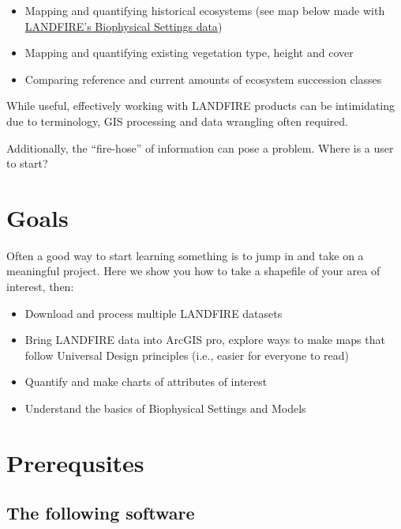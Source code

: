 \documentclass[
  letterpaper,
  DIV=11,
  numbers=noendperiod]{scrreprt}
\providecommand{\tightlist}{%
  \setlength{\itemsep}{0pt}\setlength{\parskip}{0pt}}\usepackage{longtable,booktabs,array}
\begin{document}
\begin{itemize}
\tightlist
\item
  Mapping and quantifying historical ecosystems (see map below made with
  \href{https://landfire.gov/bps.php}{LANDFIRE's Biophysical Settings
  data})
\item
  Mapping and quantifying existing vegetation type, height and cover
\item
  Comparing reference and current amounts of ecosystem succession
  classes
\end{itemize}

While useful, effectively working with LANDFIRE products can be
intimidating due to terminology, GIS processing and data wrangling often
required.

Additionally, the ``fire-hose'' of information can pose a problem. Where
is a user to start?

\hypertarget{goals}{%
\section*{Goals}\label{goals}}


Often a good way to start learning something is to jump in and take on a
meaningful project. Here we show you how to take a shapefile of your
area of interest, then:

\begin{itemize}
\tightlist
\item
  Download and process multiple LANDFIRE datasets
\item
  Bring LANDFIRE data into ArcGIS pro, explore ways to make maps that
  follow Universal Design principles (i.e., easier for everyone to read)
\item
  Quantify and make charts of attributes of interest
\item
  Understand the basics of Biophysical Settings and Models
\end{itemize}

\hypertarget{prerequsites}{%
\section*{Prerequsites}\label{prerequsites}}


\hypertarget{the-following-software}{%
\subsection*{The following software}\label{the-following-software}}
\end{document}
